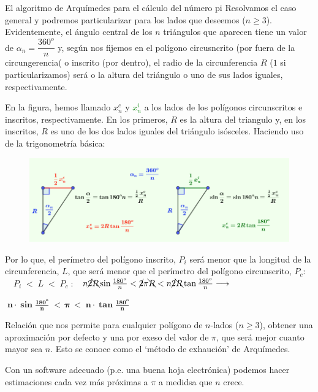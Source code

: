 \begin{myexampleblock}{El algoritmo de Arquímedes para el cálculo del número pi}
		\noindent \small{Resolvamos el caso general y podremos particularizar para los lados que deseemos ($n \ge 3$).  Evidentemente, el ángulo central de los $n$ triángulos que aparecen tiene un valor de $\alpha_n=\dfrac {360^o}{n}$ y, según nos fijemos en el polígono circusncrito (por fuera de la circungerencia( o inscrito (por dentro), el radio de la circunferencia $R$ ($1$ si particularizamos) será o la altura del triángulo o uno de sus lados iguales, respectivamente.}
		
		\noindent \small{En la figura, hemos llamado \textcolor{verd}{$x_n^c$} y \textcolor{green}{$x_n^i$} a los lados de los polígonos circunscritos e inscritos, respectivamente. En los primeros, $R$ es la altura del triangulo y, en los inscritos, $R$ es uno de los dos lados iguales del triángulo isósceles. Haciendo uso de la trigonometría básica:}
		
	\begin{figure}[H]
		\centering
		\includegraphics[width=1\textwidth]{img-ft/T01IM27.png}
	\end{figure}
	


\noindent Por lo que, el perímetro del polígono
 inscrito, $P_i$ será menor que la longitud de la circunferencia, $L$, que será  menor que	 el perímetro del polígono circunscrito, $P_c$: $\quad P_i\; <\; L \; < \; P_c\; :$
 $\; \; n \cancel{2} \bcancel{R} \sin \frac {180^o}{n} < \cancel{2} \pi \bcancel{R} < n \cancel{2} \bcancel{R} \tan \frac {180^o}{n} \longrightarrow $
 
 \noindent $\boxed{\boldsymbol{\; n\cdot \sin \frac {180^o}{n} \; <\, \pi \, < \; n\cdot \tan \frac {180^o}{n} \;}} $
 
\noindent  Relación que nos permite para cualquier polígono de $n$-lados ($n\ge 3$), obtener una aproximación por defecto y una por exeso del valor de $\pi$, que será mejor cuanto mayor sea $n$. Esto se conoce como el `método de exhaución' de Arquímedes.
 
\noindent  Con un software adecuado (p.e. una buena hoja electrónica) podemos hacer estimaciones cada vez más próximas a $\pi$ a medidsa que $n$ crece.
 

\end{myexampleblock}
